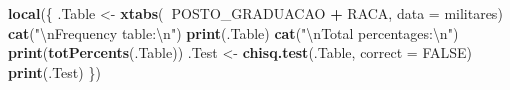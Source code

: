 \documentclass[
]{article}
\newenvironment{Shaded}{\begin{snugshade}}{\end{snugshade}}
\newcommand{\CharTok}[1]{\textcolor[rgb]{0.31,0.60,0.02}{#1}}
\newcommand{\DataTypeTok}[1]{\textcolor[rgb]{0.13,0.29,0.53}{#1}}
\newcommand{\KeywordTok}[1]{\textcolor[rgb]{0.13,0.29,0.53}{\textbf{#1}}}
\newcommand{\NormalTok}[1]{#1}
\newcommand{\OperatorTok}[1]{\textcolor[rgb]{0.81,0.36,0.00}{\textbf{#1}}}
\newcommand{\OtherTok}[1]{\textcolor[rgb]{0.56,0.35,0.01}{#1}}
\newcommand{\StringTok}[1]{\textcolor[rgb]{0.31,0.60,0.02}{#1}}
\begin{document}
\begin{Shaded}
\begin{Highlighting}[]
\KeywordTok{local}\NormalTok{(\{}
\NormalTok{    .Table <-}\StringTok{ }\KeywordTok{xtabs}\NormalTok{(}\OperatorTok{~}\NormalTok{POSTO_GRADUACAO }\OperatorTok{+}\StringTok{ }\NormalTok{RACA, }\DataTypeTok{data =}\NormalTok{ militares)}
    \KeywordTok{cat}\NormalTok{(}\StringTok{"}\CharTok{\textbackslash{}n}\StringTok{Frequency table:}\CharTok{\textbackslash{}n}\StringTok{"}\NormalTok{)}
    \KeywordTok{print}\NormalTok{(.Table)}
    \KeywordTok{cat}\NormalTok{(}\StringTok{"}\CharTok{\textbackslash{}n}\StringTok{Total percentages:}\CharTok{\textbackslash{}n}\StringTok{"}\NormalTok{)}
    \KeywordTok{print}\NormalTok{(}\KeywordTok{totPercents}\NormalTok{(.Table))}
\NormalTok{    .Test <-}\StringTok{ }\KeywordTok{chisq.test}\NormalTok{(.Table, }\DataTypeTok{correct =} \OtherTok{FALSE}\NormalTok{)}
    \KeywordTok{print}\NormalTok{(.Test)}
\NormalTok{\})}
\end{Highlighting}
\end{Shaded}
\end{document}
